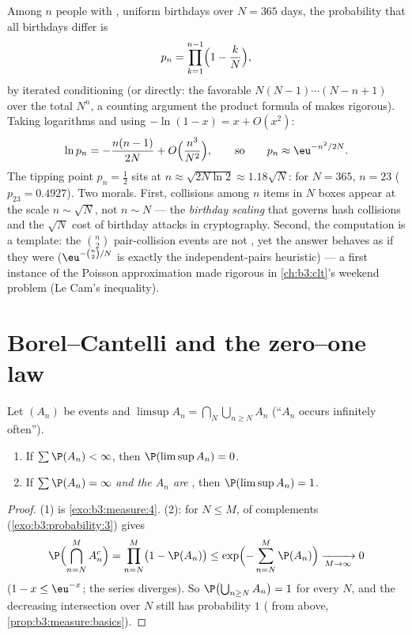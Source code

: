 \begin{example}
\label{ex:b3:probability:birthday}
Among $n$ people with , uniform birthdays over
$N = 365$ days, the probability that all birthdays differ is
\[
p_n = \prod_{k=1}^{n-1}\Bigl(1 - \frac kN\Bigr),
\]
by iterated conditioning (or directly: the favorable
$N(N-1)\cdots(N - n + 1)$ over the total $N^n$, a counting
argument the product formula of  makes
rigorous). Taking logarithms and using $-\ln(1 - x) = x +
O(x^2)$:
\[
\ln p_n = -\frac{n(n-1)}{2N} +
O\Bigl(\frac{n^3}{N^2}\Bigr),
\qquad\text{so}\qquad
p_n \approx \eu^{-n^2/2N} .
\]
The tipping point $p_n = \frac12$ sits at $n \approx
\sqrt{2N\ln2} \approx 1.18\sqrt N$: for $N = 365$, $n = 23$
($p_{23} = 0.4927$). Two morals. First, collisions among $n$
items in $N$ boxes appear at the scale $n \sim \sqrt N$, not
$n \sim N$ --- the \emph{birthday scaling} that governs hash
collisions and the $\sqrt N$ cost of birthday attacks in
cryptography. Second, the computation is a template: the
$\binom n2$ pair-collision events are not , yet
the answer behaves as if they were
($\eu^{-\binom n2/N}$ is exactly the independent-pairs
heuristic) --- a first instance of the Poisson
approximation made rigorous in \cref{ch:b3:clt}'s weekend
problem (Le Cam's inequality).
\end{example}

\section{Borel--Cantelli and the zero--one law}

\begin{theorem}
\label{thm:b3:probability:borelcantelli}
Let $(A_n)$ be events and $\limsup A_n = \bigcap_N
\bigcup_{n\geq N}A_n$ (``$A_n$ occurs infinitely
often'').
\begin{enumerate}
  \item If $\sum\P(A_n) < \infty$, then $\P(\limsup A_n) =
        0$.
  \item If $\sum\P(A_n) = \infty$ \emph{and the $A_n$ are
        }, then $\P(\limsup A_n) = 1$.
\end{enumerate}
\end{theorem}

\begin{proof}
(1) is \cref{exo:b3:measure:4}. (2): for $N \leq M$,
 of complements (\cref{exo:b3:probability:3})
gives
\[
\P\Bigl(\bigcap_{n=N}^{M}A_n^c\Bigr) = \prod_{n=N}^M\bigl(1
- \P(A_n)\bigr) \leq
\exp\Bigl(-\sum_{n=N}^M\P(A_n)\Bigr) \xrightarrow[M \to
\infty]{} 0
\]
($1 - x \leq \eu^{-x}$; the series diverges). So
$\P\bigl(\bigcup_{n\geq N}A_n\bigr) = 1$ for every $N$, and
the decreasing intersection over $N$ still has probability
$1$ ( from above, \cref{prop:b3:measure:basics}).
\end{proof}

